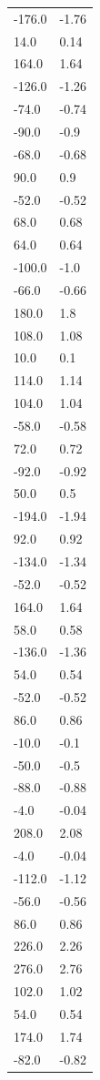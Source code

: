 \begin{longtable}{ll}
-176.0 & -1.76 \\
14.0 & 0.14 \\
164.0 & 1.64 \\
-126.0 & -1.26 \\
-74.0 & -0.74 \\
-90.0 & -0.9 \\
-68.0 & -0.68 \\
90.0 & 0.9 \\
-52.0 & -0.52 \\
68.0 & 0.68 \\
64.0 & 0.64 \\
-100.0 & -1.0 \\
-66.0 & -0.66 \\
180.0 & 1.8 \\
108.0 & 1.08 \\
10.0 & 0.1 \\
114.0 & 1.14 \\
104.0 & 1.04 \\
-58.0 & -0.58 \\
72.0 & 0.72 \\
-92.0 & -0.92 \\
50.0 & 0.5 \\
-194.0 & -1.94 \\
92.0 & 0.92 \\
-134.0 & -1.34 \\
-52.0 & -0.52 \\
164.0 & 1.64 \\
58.0 & 0.58 \\
-136.0 & -1.36 \\
54.0 & 0.54 \\
-52.0 & -0.52 \\
86.0 & 0.86 \\
-10.0 & -0.1 \\
-50.0 & -0.5 \\
-88.0 & -0.88 \\
-4.0 & -0.04 \\
208.0 & 2.08 \\
-4.0 & -0.04 \\
-112.0 & -1.12 \\
-56.0 & -0.56 \\
86.0 & 0.86 \\
226.0 & 2.26 \\
276.0 & 2.76 \\
102.0 & 1.02 \\
54.0 & 0.54 \\
174.0 & 1.74 \\
-82.0 & -0.82 \\

\end{longtable}
